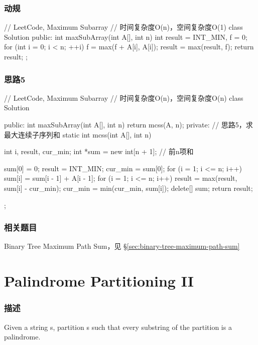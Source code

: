 \subsubsection{动规}
\begin{Code}
// LeetCode, Maximum Subarray
// 时间复杂度O(n)，空间复杂度O(1)
class Solution {
public:
    int maxSubArray(int A[], int n) {
        int result = INT_MIN, f = 0;
        for (int i = 0; i < n; ++i) {
            f = max(f + A[i], A[i]);
            result = max(result, f);
        }
        return result;
    }
};
\end{Code}


\subsubsection{思路5}
\begin{Code}
// LeetCode, Maximum Subarray
// 时间复杂度O(n)，空间复杂度O(n)
class Solution {
public:
    int maxSubArray(int A[], int n) {
        return mcss(A, n);
    }
private:
    // 思路5，求最大连续子序列和
    static int mcss(int A[], int n) {
        int i, result, cur_min;
        int *sum = new int[n + 1];  // 前n项和

        sum[0] = 0;
        result = INT_MIN;
        cur_min = sum[0];
        for (i = 1; i <= n; i++) {
            sum[i] = sum[i - 1] + A[i - 1];
        }
        for (i = 1; i <= n; i++) {
            result = max(result, sum[i] - cur_min);
            cur_min = min(cur_min, sum[i]);
        }
        delete[] sum;
        return result;
    }
};
\end{Code}


\subsubsection{相关题目}
\begindot
\item Binary Tree Maximum Path Sum，见 \S \ref{sec:binary-tree-maximum-path-sum}
\myenddot


\section{Palindrome Partitioning II} %
\label{sec:palindrome-partitioning-ii}


\subsubsection{描述}
Given a string s, partition s such that every substring of the partition is a palindrome.

